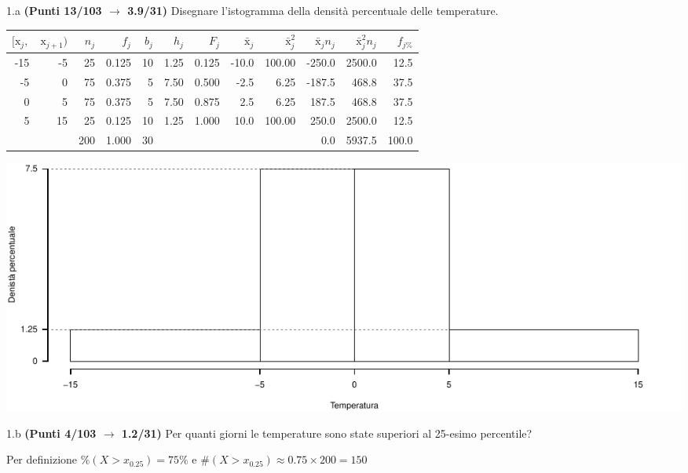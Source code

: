 \documentclass[
  11pt,
]{book}
\theoremstyle{mytheoremstyle}
\theoremstyle{mydefstyle}
\newenvironment{sol}
  {
  \begin{tcolorbox}[enhanced,breakable,arc=0.1mm,boxrule=1pt,colback=white,colframe=iblue,
  title=\bf \fontfamily{lmss}\selectfont \hspace{.5 cm} Soluzione,drop fuzzy shadow]

}{
\end{tcolorbox}
  }
\begin{document}
1.a \textbf{(Punti 13/103 \(\rightarrow\) 3.9/31)} Disegnare l'istogramma della densità percentuale delle temperature.

\begin{sol}

\begin{table}[H]
\centering
\begin{tabular}{rrrrrrrrrrrr}
\toprule
$[\text{x}_j,$ & $\text{x}_{j+1})$ & $n_j$ & $f_j$ & $b_j$ & $h_j$ & $F_j$ & $\bar{\text{x}}_j$ & $\bar{\text{x}}_j^2$ & $\bar{\text{x}}_jn_j$ & $\bar{\text{x}}_j^2 n_j$ & $f_{j\%}$\\
\midrule
-15 & -5 & 25 & 0.125 & 10 & 1.25 & 0.125 & -10.0 & 100.00 & -250.0 & 2500.0 & 12.5\\
-5 & 0 & 75 & 0.375 & 5 & 7.50 & 0.500 & -2.5 & 6.25 & -187.5 & 468.8 & 37.5\\
0 & 5 & 75 & 0.375 & 5 & 7.50 & 0.875 & 2.5 & 6.25 & 187.5 & 468.8 & 37.5\\
5 & 15 & 25 & 0.125 & 10 & 1.25 & 1.000 & 10.0 & 100.00 & 250.0 & 2500.0 & 12.5\\
 &  & 200 & 1.000 & 30 &  &  &  &  & 0.0 & 5937.5 & 100.0\\
\bottomrule
\end{tabular}
\end{table}

\begin{center}\includegraphics{Esami_passati_con_soluzioni_files/figure-latex/unnamed-chunk-83-1} \end{center}

\end{sol}

1.b \textbf{(Punti 4/103 \(\rightarrow\) 1.2/31)} Per quanti giorni le temperature sono state superiori al 25-esimo percentile?

\begin{sol}
Per definizione \(\%(X>x_{0.25})=75\%\) e
\(\#(X>x_{0.25})\approx0.75\times200 =150\)

\end{sol}
\end{document}
